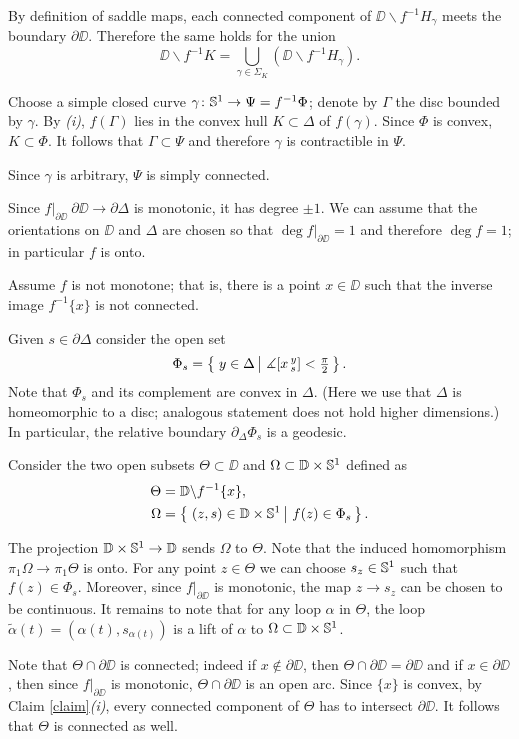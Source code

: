 \documentclass{article}
\begin{document}
By definition of saddle maps, each connected component of $\DD\backslash f^{-1}H_\gamma$ meets the boundary $\partial \DD$.
Therefore the same holds for the union
\[\DD\backslash f^{-1}K=\bigcup_{\gamma\in\Sigma_K}(\DD\backslash f^{-1}H_\gamma).\]

Choose a simple closed curve $\gamma\colon\mathbb{S}^1\to\Psi=f^{-1}\Phi$;
denote by $\Gamma$ the disc bounded by $\gamma$.
By \textit{(i)}, $f(\Gamma)$ lies in the convex hull $K\subset \Delta$ of $f(\gamma)$.
Since $\Phi$ is convex,  $K\subset \Phi$.
It follows that $\Gamma\subset\Psi$ and therefore $\gamma$ is contractible in $\Psi$.

Since $\gamma$ is arbitrary, $\Psi$ is simply connected.
\qeds

Since $f|_{\partial\DD}\:\partial\DD \to\partial \Delta$ is monotonic, it has degree $\pm1$.
We can assume that the orientations on $\DD$ and $\Delta$ are chosen so that $\deg f|_{\partial\DD}=1$
and therefore $\deg f=1$;
in particular $f$ is onto.

Assume $f$ is not monotone;
that is, there is a point $x\in \DD$ such that the inverse image $f^{-1}\{x\}$ is not connected.

Given $s\in\partial \Delta$ consider the open set
\[\Phi_s=\set{y\in\Delta}{\measuredangle [x\,^y_s]<\tfrac\pi2}.\]
Note that $\Phi_s$ and its complement are convex in $\Delta$.
(Here we use that $\Delta$ is homeomorphic to a disc; analogous statement does not hold higher dimensions.)
In particular, the relative boundary $\partial_\Delta\Phi_s$ is a geodesic.

Consider the two open subsets $\Theta\subset \DD$ and $\Omega\subset  \mathbb{D}\times\mathbb{S}^1$ defined as
\begin{align*}
\Theta&=\DD\backslash f^{-1}\{x\},
\\
\Omega&=\set{(z,s)\in \DD\times\SS^1}{f(z)\in \Phi_s}.
\end{align*}

The  projection $\mathbb{D}\times\mathbb{S}^1\to \mathbb{D}$ sends $\Omega$ to $\Theta$.
Note that the induced homomorphism $\pi_1\Omega\to \pi_1\Theta$ is onto.
For any point $z\in \Theta$ we can choose $s_z\in \mathbb{S}^1$ such that $f(z)\in \Phi_s$.
Moreover, since $f|_{\partial\DD}$ is monotonic, the map $z\to s_z$ can be chosen to be continuous.
It remains to note that for any loop $\alpha$ in $\Theta$, the loop $\tilde\alpha(t)=(\alpha(t),s_{\alpha(t)})$ is a lift of $\alpha$ to $\Omega\subset\mathbb{D}\times\mathbb{S}^1$.

Note that $\Theta\cap \partial\DD$ is connected;
indeed if $x\notin \partial\DD$, then $\Theta\cap \partial\DD=\partial \DD$
and if $x\in \partial\DD$, then since $f|_{\partial\DD}$ is monotonic, $\Theta\cap \partial\DD$ is an open arc.
Since $\{x\}$ is convex, by Claim \ref{claim}\textit{(i)}, every connected component of $\Theta$ has to intersect $\partial\DD$.
It follows that $\Theta$ is connected as well.
\end{document}
